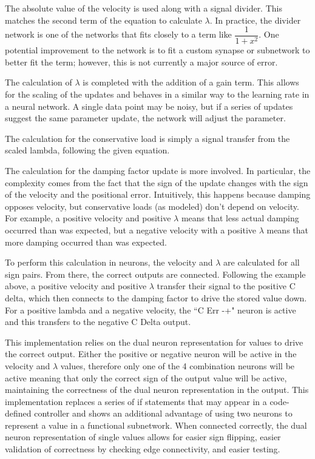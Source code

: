 
The absolute value of the velocity is used along with a signal divider. This
matches the second term of the equation to calculate $\lambda$. In practice,
the divider network is one of the networks that fits closely to a term like
$\dfrac{1}{1 + x^{2}}$. One potential improvement to the network is to fit
a custom synapse or subnetwork to better fit the term; however, this is not
currently a major source of error.


The calculation of $\lambda$ is completed with the addition of a gain term. This
allows for the scaling of the updates and behaves in a similar way to the 
learning rate in a neural network. A single data point may be noisy, but if a 
series of updates suggest the same parameter update, the network will adjust the
parameter.


The calculation for the conservative load is simply a signal transfer from the scaled lambda, following the given equation.


The calculation for the damping factor update is more involved. In particular,
the complexity comes from the fact that the sign of the update changes with the
sign of the velocity and the positional error. Intuitively, this happens because
damping opposes velocity, but conservative loads (as modeled) don't depend on
velocity. For example, a positive velocity and positive $\lambda$ means that 
less actual damping occurred than was expected, but a negative velocity with a 
positive $\lambda$ means that more damping occurred than was expected.

To perform this calculation in neurons, the velocity and $\lambda$ are 
calculated for all sign pairs. From there, the correct outputs are connected.
Following the example above, a positive velocity and positive $\lambda$ transfer
their signal to the positive C delta, which then connects to the damping factor 
to drive the stored value down. For a positive lambda and a negative velocity, the ``C Err -+" neuron is active and this transfers to the negative C Delta output.

This implementation relies on the dual neuron representation for values to drive
the correct output. Either the positive or negative neuron will be active in the
velocity and $\lambda$ values, therefore only one of the 4 combination neurons
will be active meaning that only the correct sign of the output value will be
active, maintaining the correctness of the dual neuron representation in the 
output. This implementation replaces a series of if statements that may appear
in a code-defined controller and shows an additional advantage of using two
neurons to represent a value in a functional subnetwork. When connected 
correctly, the dual neuron representation of single values allows for easier sign flipping, easier validation of correctness
by checking edge connectivity, and easier testing.

